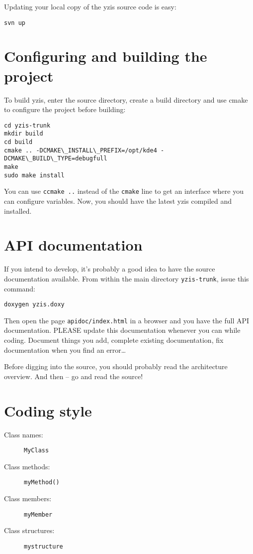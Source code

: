 \documentclass[a4paper,12pt]{report}
\begin{document}
Updating your local copy of the yzis source code is easy:

\begin{verbatim}
svn up
\end{verbatim}

\section{Configuring and building the project}

To build yzis, enter the source directory, create a build directory and use
cmake to configure the project before building:

\begin{verbatim}
cd yzis-trunk
mkdir build
cd build
cmake .. -DCMAKE\_INSTALL\_PREFIX=/opt/kde4 -DCMAKE\_BUILD\_TYPE=debugfull
make
sudo make install
\end{verbatim}

You can use \verb+ccmake ..+ instead of the \verb+cmake+ line to get an
interface where you can configure variables.
Now, you should have the latest yzis compiled and installed.

\section{API documentation}

If you intend to develop, it's probably a good idea to have the source
documentation available. From within the main directory \verb+yzis-trunk+, issue
this command:

\begin{verbatim}
doxygen yzis.doxy
\end{verbatim}

Then open the page \verb+apidoc/index.html+ in a browser and you
have the full API documentation. PLEASE update this documentation whenever you
can while coding. Document things you add, complete existing documentation, fix
documentation when you find an error\ldots{}

Before digging into the source, you should probably read the architecture
overview. And then -- go and read the source!

\section{Coding style}

\begin{description}
	\item[Class names:] \verb+MyClass+
	\item[Class methods:] \verb+myMethod()+
	\item[Class members:] \verb+myMember+
	\item[Class structures:] \verb+mystructure+
\end{description}
\end{document}
